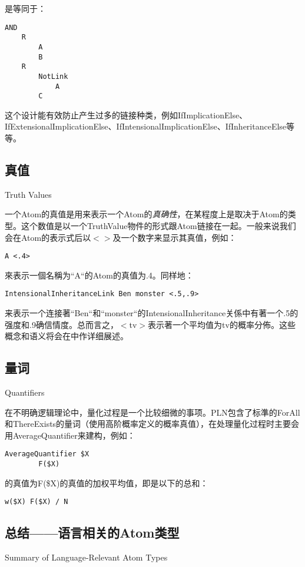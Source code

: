 是等同于：

\begin{verbatim}
AND
	R
		A
		B
	R
		NotLink
			A
		C
\end{verbatim}

\noindent 这个设计能有效防止产生过多的链接种类，例如IfImplicationElse、IfExtensionalImplicationElse、IfIntensionalImplicationElse、IfInheritanceElse等等。
	
		
\subsection{真值}{Truth Values}
\label{真值}

一个Atom的真值是用来表示一个Atom的\textit{真确性}，在某程度上是取决于Atom的类型。这个数值是以一个TruthValue物件的形式跟Atom链接在一起。一般来说我们会在Atom的表示式后以\ensuremath{<}\ensuremath{>}及一个数字来显示其真值，例如：

\begin{verbatim}
A <.4>
\end{verbatim}

來表示一個名稱为“A“的Atom的真值为.4。同样地：

\begin{verbatim}
IntensionalInheritanceLink Ben monster <.5,.9>
\end{verbatim}

\noindent 来表示一个连接著“Ben“和“monster“的IntensionalInheritance关係中有著一个.5的强度和.9确信情度。总而言之，\ensuremath{<}tv\ensuremath{>}表示著一个平均值为tv的概率分佈。这些概念和语义将会在\cite{PLN}中作详细展述。

\subsection{量词}{Quantiﬁers}  

在不明确逻辑理论中，量化过程是一个比较细微的事项。PLN包含了标準的ForAll和ThereExists的量词（使用高阶概率定义的概率真值），在处理量化过程时主要会用AverageQuantifier来建构，例如：

\begin{verbatim}
AverageQuantifier $X
        F($X)
\end{verbatim}

的真值为F(\$X)的真值的加权平均值，即是以下的总和：

\begin{verbatim}
w($X) F($X) / N
\end{verbatim}

\subsection{总结——语言相关的Atom类型}{Summary of Language-Relevant Atom Types}

